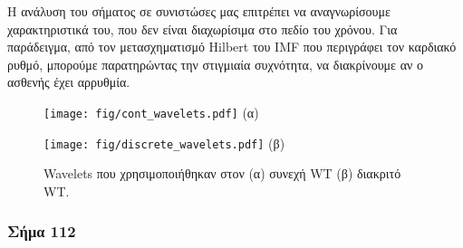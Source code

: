 \documentclass[11pt,a4paper]{article}
\begin{document}
Η ανάλυση του σήματος σε συνιστώσες μας επιτρέπει να αναγνωρίσουμε χαρακτηριστικά του, που δεν είναι διαχωρίσιμα στο πεδίο του χρόνου. Για παράδειγμα, από τον μετασχηματισμό Hilbert του IMF που περιγράφει τον καρδιακό ρυθμό, μπορούμε παρατηρώντας την στιγμιαία συχνότητα, να διακρίνουμε αν ο ασθενής έχει αρρυθμία.

\begin{figure}[H]
\centering
\begin{minipage}{0.48\textwidth}
	\centering
	\texttt{[image: fig/cont\_wavelets.pdf]}
	(α)
\end{minipage}
\begin{minipage}{0.48\textwidth}
	\centering
	\texttt{[image: fig/discrete\_wavelets.pdf]}
	(β)
\end{minipage}
\vfill
\caption{Wavelets που χρησιμοποιήθηκαν στον (α) συνεχή WT (β) διακριτό WT.}
\label{fig:wavelets}
\end{figure}


\subsubsection*{Σήμα 112}
\end{document}
